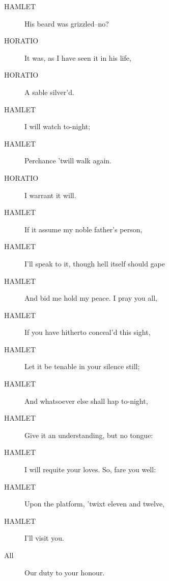 \documentclass{article}
\begin{document}
\begin{description}
            
\item[HAMLET] His beard was grizzled--no?
\end{description}
          
\begin{description}
            
\item[HORATIO] It was, as I have seen it in his life,
\item[HORATIO] A sable silver'd.
\end{description}
          
\begin{description}
            
\item[HAMLET] I will watch to-night;
\item[HAMLET] Perchance 'twill walk again.
\end{description}
          
\begin{description}
            
\item[HORATIO] I warrant it will.
\end{description}
          
\begin{description}
            
\item[HAMLET] If it assume my noble father's person,
\item[HAMLET] I'll speak to it, though hell itself should gape
\item[HAMLET] And bid me hold my peace. I pray you all,
\item[HAMLET] If you have hitherto conceal'd this sight,
\item[HAMLET] Let it be tenable in your silence still;
\item[HAMLET] And whatsoever else shall hap to-night,
\item[HAMLET] Give it an understanding, but no tongue:
\item[HAMLET] I will requite your loves. So, fare you well:
\item[HAMLET] Upon the platform, 'twixt eleven and twelve,
\item[HAMLET] I'll visit you.
\end{description}
          
\begin{description}
            
\item[All] Our duty to your honour.
\end{description}
          
\end{document}
